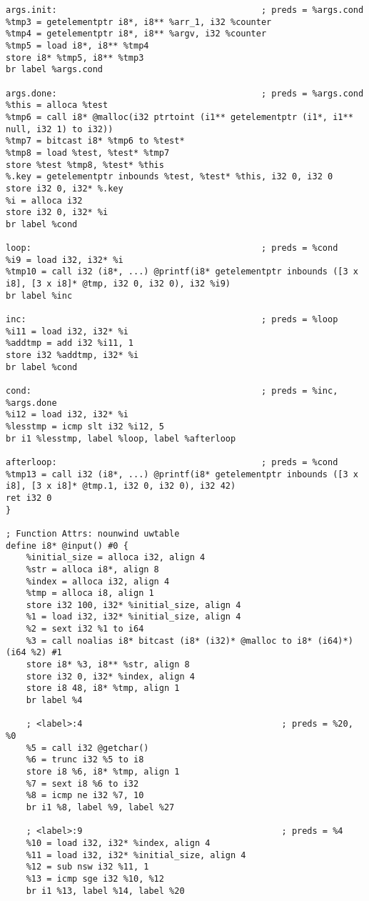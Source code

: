 \begin{verbatim}
args.init:                                        ; preds = %args.cond
%tmp3 = getelementptr i8*, i8** %arr_1, i32 %counter
%tmp4 = getelementptr i8*, i8** %argv, i32 %counter
%tmp5 = load i8*, i8** %tmp4
store i8* %tmp5, i8** %tmp3
br label %args.cond

args.done:                                        ; preds = %args.cond
%this = alloca %test
%tmp6 = call i8* @malloc(i32 ptrtoint (i1** getelementptr (i1*, i1** null, i32 1) to i32))
%tmp7 = bitcast i8* %tmp6 to %test*
%tmp8 = load %test, %test* %tmp7
store %test %tmp8, %test* %this
%.key = getelementptr inbounds %test, %test* %this, i32 0, i32 0
store i32 0, i32* %.key
%i = alloca i32
store i32 0, i32* %i
br label %cond

loop:                                             ; preds = %cond
%i9 = load i32, i32* %i
%tmp10 = call i32 (i8*, ...) @printf(i8* getelementptr inbounds ([3 x i8], [3 x i8]* @tmp, i32 0, i32 0), i32 %i9)
br label %inc

inc:                                              ; preds = %loop
%i11 = load i32, i32* %i
%addtmp = add i32 %i11, 1
store i32 %addtmp, i32* %i
br label %cond

cond:                                             ; preds = %inc, %args.done
%i12 = load i32, i32* %i
%lesstmp = icmp slt i32 %i12, 5
br i1 %lesstmp, label %loop, label %afterloop

afterloop:                                        ; preds = %cond
%tmp13 = call i32 (i8*, ...) @printf(i8* getelementptr inbounds ([3 x i8], [3 x i8]* @tmp.1, i32 0, i32 0), i32 42)
ret i32 0
}

; Function Attrs: nounwind uwtable
define i8* @input() #0 {
	%initial_size = alloca i32, align 4
	%str = alloca i8*, align 8
	%index = alloca i32, align 4
	%tmp = alloca i8, align 1
	store i32 100, i32* %initial_size, align 4
	%1 = load i32, i32* %initial_size, align 4
	%2 = sext i32 %1 to i64
	%3 = call noalias i8* bitcast (i8* (i32)* @malloc to i8* (i64)*)(i64 %2) #1
	store i8* %3, i8** %str, align 8
	store i32 0, i32* %index, align 4
	store i8 48, i8* %tmp, align 1
	br label %4
	
	; <label>:4                                       ; preds = %20, %0
	%5 = call i32 @getchar()
	%6 = trunc i32 %5 to i8
	store i8 %6, i8* %tmp, align 1
	%7 = sext i8 %6 to i32
	%8 = icmp ne i32 %7, 10
	br i1 %8, label %9, label %27
	
	; <label>:9                                       ; preds = %4
	%10 = load i32, i32* %index, align 4
	%11 = load i32, i32* %initial_size, align 4
	%12 = sub nsw i32 %11, 1
	%13 = icmp sge i32 %10, %12
	br i1 %13, label %14, label %20
	

\end{verbatim}
